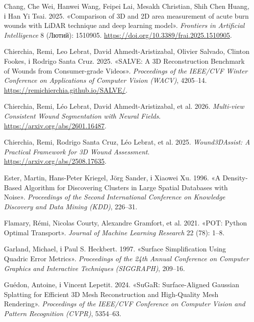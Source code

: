 \documentclass[
  ukrainian,
  10pt,
  a4paper,
  twocolumn]{article}
\newlength{\cslhangindent}
\newenvironment{CSLReferences}[2] %
 {\begin{list}{}{%
  \setlength{\itemindent}{0pt}
  \setlength{\leftmargin}{0pt}
  \setlength{\parsep}{0pt}
  \ifodd #1
   \setlength{\leftmargin}{\cslhangindent}
   \setlength{\itemindent}{-1\cslhangindent}
  \fi
  \setlength{\itemsep}{#2\baselineskip}}}
 {\end{list}}
\begin{document}
\protect{}\label{refs}
\begin{CSLReferences}{1}{1}
Chang, Che Wei, Hanwei Wang, Feipei Lai, Mesakh Christian, Shih Chen
Huang, і Han Yi Tsai. 2025. {«Comparison of {3D} and {2D} area
measurement of acute burn wounds with {LiDAR} technique and deep
learning model»}. \emph{Frontiers in Artificial Intelligence} 8 (Лютий):
1510905. \url{https://doi.org/10.3389/frai.2025.1510905}.

Chierchia, Remi, Leo Lebrat, David Ahmedt-Aristizabal, Olivier Salvado,
Clinton Fookes, і Rodrigo Santa Cruz. 2025. {«{SALVE}: A {3D}
Reconstruction Benchmark of Wounds from Consumer-grade Videos»}.
\emph{Proceedings of the IEEE/CVF Winter Conference on Applications of
Computer Vision (WACV)}, 4205--14.
\url{https://remichierchia.github.io/SALVE/}.

Chierchia, Remi, Léo Lebrat, David Ahmedt-Aristizabal, et al. 2026.
\emph{Multi-view Consistent Wound Segmentation with Neural Fields}.
\url{https://arxiv.org/abs/2601.16487}.

Chierchia, Remi, Rodrigo Santa Cruz, Léo Lebrat, et al. 2025.
\emph{{Wound3DAssist}: A Practical Framework for {3D} Wound Assessment}.
\url{https://arxiv.org/abs/2508.17635}.

Ester, Martin, Hans-Peter Kriegel, Jörg Sander, і Xiaowei Xu. 1996. {«A
Density-Based Algorithm for Discovering Clusters in Large Spatial
Databases with Noise»}. \emph{Proceedings of the Second International
Conference on Knowledge Discovery and Data Mining (KDD)}, 226--31.

Flamary, Rémi, Nicolas Courty, Alexandre Gramfort, et al. 2021. {«{POT}:
{Python Optimal Transport}»}. \emph{Journal of Machine Learning
Research} 22 (78): 1--8.

Garland, Michael, і Paul S. Heckbert. 1997. {«Surface Simplification
Using Quadric Error Metrics»}. \emph{Proceedings of the 24th Annual
Conference on Computer Graphics and Interactive Techniques (SIGGRAPH)},
209--16.

Guédon, Antoine, і Vincent Lepetit. 2024. {«{SuGaR}: Surface-Aligned
{Gaussian} Splatting for Efficient {3D} Mesh Reconstruction and
High-Quality Mesh Rendering»}. \emph{Proceedings of the IEEE/CVF
Conference on Computer Vision and Pattern Recognition (CVPR)}, 5354--63.


\end{CSLReferences}
\end{document}
